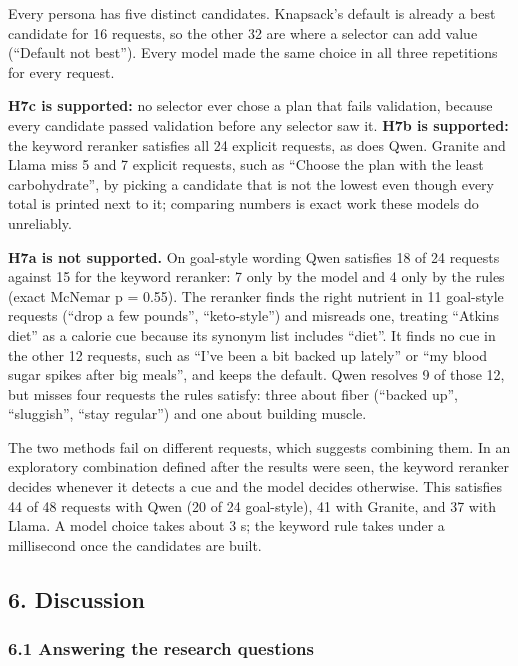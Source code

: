 \documentclass[
  10pt,
  letterpaper,
]{article}
\begin{document}
Every persona has five distinct candidates. Knapsack's default is
already a best candidate for 16 requests, so the other 32 are where a
selector can add value (``Default not best''). Every model made the same
choice in all three repetitions for every request.

\textbf{H7c is supported:} no selector ever chose a plan that fails
validation, because every candidate passed validation before any
selector saw it. \textbf{H7b is supported:} the keyword reranker
satisfies all 24 explicit requests, as does Qwen. Granite and Llama miss
5 and 7 explicit requests, such as ``Choose the plan with the least
carbohydrate'', by picking a candidate that is not the lowest even
though every total is printed next to it; comparing numbers is exact
work these models do unreliably.

\textbf{H7a is not supported.} On goal-style wording Qwen satisfies 18
of 24 requests against 15 for the keyword reranker: 7 only by the model
and 4 only by the rules (exact McNemar p = 0.55). The reranker finds the
right nutrient in 11 goal-style requests (``drop a few pounds'',
``keto-style'') and misreads one, treating ``Atkins diet'' as a calorie
cue because its synonym list includes ``diet''. It finds no cue in the
other 12 requests, such as ``I've been a bit backed up lately'' or ``my
blood sugar spikes after big meals'', and keeps the default. Qwen
resolves 9 of those 12, but misses four requests the rules satisfy:
three about fiber (``backed up'', ``sluggish'', ``stay regular'') and
one about building muscle.

The two methods fail on different requests, which suggests combining
them. In an exploratory combination defined after the results were seen,
the keyword reranker decides whenever it detects a cue and the model
decides otherwise. This satisfies 44 of 48 requests with Qwen (20 of 24
goal-style), 41 with Granite, and 37 with Llama. A model choice takes
about 3 s; the keyword rule takes under a millisecond once the
candidates are built.

\subsection{6. Discussion}\label{discussion}

\subsubsection{6.1 Answering the research
questions}\label{answering-the-research-questions}
\end{document}
